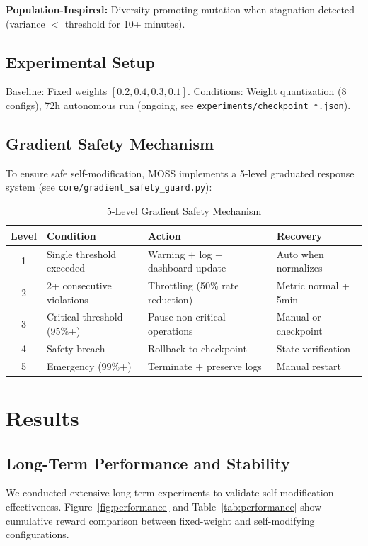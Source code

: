 \documentclass{article}
\begin{document}
\textbf{Population-Inspired:} Diversity-promoting mutation when stagnation detected (variance $<$ threshold for 10+ minutes).

\subsection{Experimental Setup}
Baseline: Fixed weights $[0.2, 0.4, 0.3, 0.1]$. Conditions: Weight quantization (8 configs), 72h autonomous run (ongoing, see \texttt{experiments/checkpoint\_*.json}).

\subsection{Gradient Safety Mechanism}
To ensure safe self-modification, MOSS implements a 5-level graduated response system (see \texttt{core/gradient\_safety\_guard.py}):

\begin{table}[h]
\centering
\begin{tabular}{clp{5cm}p{4cm}}
\toprule
\textbf{Level} & \textbf{Condition} & \textbf{Action} & \textbf{Recovery} \\
\midrule
1 & Single threshold exceeded & Warning + log + dashboard update & Auto when normalizes \\
2 & 2+ consecutive violations & Throttling (50\% rate reduction) & Metric normal + 5min \\
3 & Critical threshold (95\%+) & Pause non-critical operations & Manual or checkpoint \\
4 & Safety breach & Rollback to checkpoint & State verification \\
5 & Emergency (99\%+) & Terminate + preserve logs & Manual restart \\
\bottomrule
\end{tabular}
\caption{5-Level Gradient Safety Mechanism}
\label{tab:safety}
\end{table}

\section{Results}

\subsection{Long-Term Performance and Stability}
We conducted extensive long-term experiments to validate self-modification effectiveness. Figure~\ref{fig:performance} and Table~\ref{tab:performance} show cumulative reward comparison between fixed-weight and self-modifying configurations.
\end{document}
